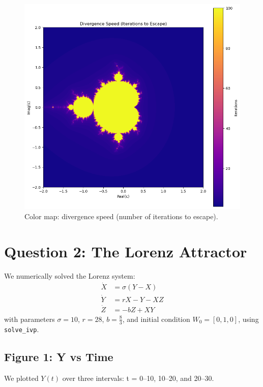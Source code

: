 \documentclass[12pt]{article}
\begin{document}
\begin{figure}[H]
    \centering
    \includegraphics[width= 1 \textwidth]{download (1).png}
    \caption{Color map: divergence speed (number of iterations to escape).}
\end{figure}

\section*{Question 2: The Lorenz Attractor}

We numerically solved the Lorenz system:
\[
\begin{aligned}
\dot{X} &= \sigma(Y - X) \\
\dot{Y} &= rX - Y - XZ \\
\dot{Z} &= -bZ + XY
\end{aligned}
\]
with parameters \( \sigma = 10 \), \( r = 28 \), \( b = \frac{8}{3} \), and initial condition \( W_0 = [0, 1, 0] \), using \texttt{solve\_ivp}.

\subsection*{Figure 1: Y vs Time}
We plotted \( Y(t) \) over three intervals: t = 0–10, 10–20, and 20–30.
\end{document}
